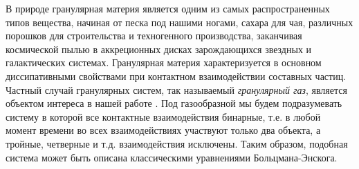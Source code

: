 \Introduction

В природе гранулярная материя является одним из самых распространенных типов вещества, начиная от песка под нашими ногами,
сахара для чая, различных порошков для строительства и техногенного производства, заканчивая космической пылью в аккреционных дисках 
зарождающихся звездных и галактических системах. Гранулярная материя характеризуется в основном диссипативными свойствами при контактном
взаимодействии составных частиц. Частный случай гранулярных систем, так называемый \emph{гранулярный газ}, является объектом интереса
в нашей работе \cite{Brilliantov:2004book}. Под газообразной мы будем подразумевать систему в которой все контактные взаимодействия бинарные, 
т.е. в любой момент времени во всех взаимодействиях участвуют только два объекта, а тройные, четверные и т.д. взаимодействия исключены.
Таким образом, подобная система может быть описана классическими уравнениями Больцмана-Энскога.

